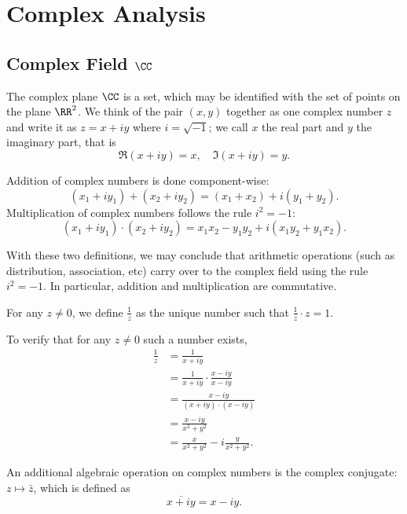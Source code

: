\part{Complex Analysis}

\chapter{Complex Field $\CC$}
The complex plane $\CC$ is a set, which may be identified with the set of points on the plane $\RR^2$. We think of the pair $(x,y)$ together as one complex number $z$ and write it as $z=x+iy$ where $i=\sqrt{-1}$; we call $x$ the real part and $y$ the imaginary part, that is
\[ \Re(x+iy)=x, \quad \Im(x+iy)=y. \]

\begin{definition}
Addition of complex numbers is done component-wise:
\[ (x_1+iy_1)+(x_2+iy_2)=(x_1+x_2)+i(y_1+y_2). \]
Multiplication of complex numbers follows the rule $i^2=-1$:
\[ (x_1+iy_1)\cdot(x_2+iy_2)=x_1x_2-y_1y_2+i(x_1y_2+y_1x_2). \]
\end{definition}

With these two definitions, we may conclude that arithmetic operations (such as distribution, association, etc) carry over to the complex field using the rule $i^2=-1$. In particular, addition and multiplication are commutative.

\begin{definition}[Division]
For any $z\neq0$, we define $\frac{1}{z}$ as the unique number such that $\frac{1}{z}\cdot z=1$.
\end{definition}

To verify that for any $z\neq0$ such a number exists,
\begin{align*}
\frac{1}{z}&=\frac{1}{x+iy}\\
&=\frac{1}{x+iy}\cdot\frac{x-iy}{x-iy}\\
&=\frac{x-iy}{(x+iy)\cdot(x-iy)}\\
&=\frac{x-iy}{x^2+y^2}\\
&=\frac{x}{x^2+y^2}-i\frac{y}{x^2+y^2}.
\end{align*}

\begin{definition}
An additional algebraic operation on complex numbers is the complex conjugate: $z\mapsto\bar{z}$, which is defined as
\[ \overline{x+iy}=x-iy. \]
\end{definition}

